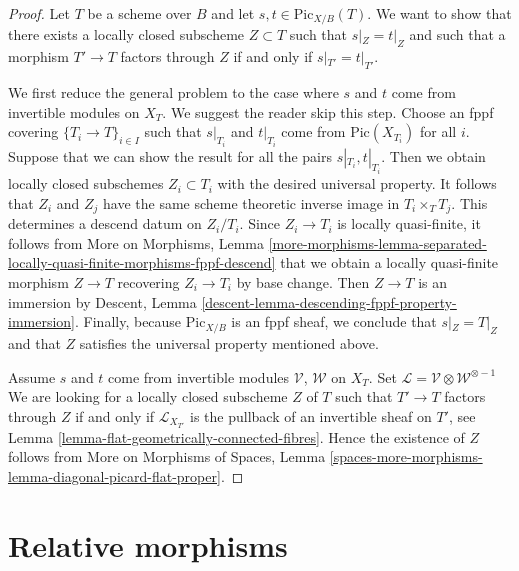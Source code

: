 \begin{proof}
Let $T$ be a scheme over $B$ and let $s, t \in \text{Pic}_{X/B}(T)$.
We want to show that there exists a locally closed subscheme $Z \subset T$
such that $s|_Z = t|_Z$ and such that a morphism $T' \to T$ factors
through $Z$ if and only if $s|_{T'} = t|_{T'}$.

\medskip\noindent
We first reduce the general problem to the case where $s$ and $t$ come
from invertible modules on $X_T$. We suggest the reader skip this step.
Choose an fppf covering $\{T_i \to T\}_{i \in I}$ such that
$s|_{T_i}$ and $t|_{T_i}$ come from $\text{Pic}(X_{T_i})$ for all $i$.
Suppose that we can show the result for all the pairs
$s|_{T_i}, t|_{T_i}$. Then we obtain locally closed subschemes
$Z_i \subset T_i$ with the desired universal property.
It follows that $Z_i$ and $Z_j$ have the same scheme theoretic
inverse image in $T_i \times_T T_j$.
This determines a descend datum on $Z_i/T_i$.
Since $Z_i \to T_i$ is locally quasi-finite, it follows from
More on Morphisms, Lemma
\ref{more-morphisms-lemma-separated-locally-quasi-finite-morphisms-fppf-descend}
that we obtain a locally quasi-finite morphism $Z \to T$
recovering $Z_i \to T_i$ by base change. Then $Z \to T$ is an immersion
by Descent, Lemma \ref{descent-lemma-descending-fppf-property-immersion}.
Finally, because $\text{Pic}_{X/B}$ is an fppf sheaf, we conclude
that $s|_Z = T|_Z$ and that $Z$ satisfies the universal property
mentioned above.

\medskip\noindent
Assume $s$ and $t$ come from invertible modules $\mathcal{V}$, $\mathcal{W}$
on $X_T$.
Set $\mathcal{L} = \mathcal{V} \otimes \mathcal{W}^{\otimes -1}$
We are looking for a locally closed subscheme $Z$ of $T$
such that $T' \to T$ factors through $Z$ if and only if $\mathcal{L}_{X_{T'}}$
is the pullback of an invertible sheaf on $T'$, see
Lemma \ref{lemma-flat-geometrically-connected-fibres}.
Hence the existence of $Z$ follows from
More on Morphisms of Spaces, Lemma
\ref{spaces-more-morphisms-lemma-diagonal-picard-flat-proper}.
\end{proof}











\section{Relative morphisms}
\label{section-relative-morphisms}

